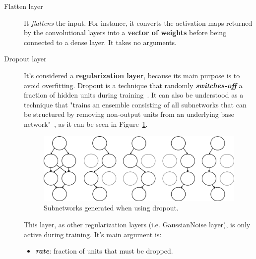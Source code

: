 \begin{description}
	\item[Flatten layer] It \textit{flattens} the input. For instance, it converts the activation maps returned by the convolutional layers into a \textbf{vector of weights} before being connected to a dense layer. It takes no arguments.
\end{description}

\begin{description}
	\item[Dropout layer] It's considered a \textbf{regularization layer}, because its main purpose is to avoid overfitting. Dropout is a technique that randomly \textbf{\textit{switches-off}} a fraction of hidden units during training~\cite{srivastava2014dropout}. It can also be understood as a technique that "trains an ensemble consisting of all subnetworks that can be structured by removing non-output units from an underlying base network"~\cite{Goodfellow-et-al-2016}, as it can be seen in Figure~\ref{fig:dropout}.

	\begin{figure}
		\centering
		\includegraphics[width=1\linewidth, keepaspectratio]{figures/dropout.png}
		\caption{Subnetworks generated when using dropout.}
		\label{fig:dropout}
	\end{figure}	

	 This layer, as other regularization layers (i.e. GaussianNoise layer), is only active during training. It's main argument is:
	\begin{itemize}
		\item \textbf{\textit{rate}}: fraction of units that must be dropped.
	\end{itemize}
	
\end{description}

